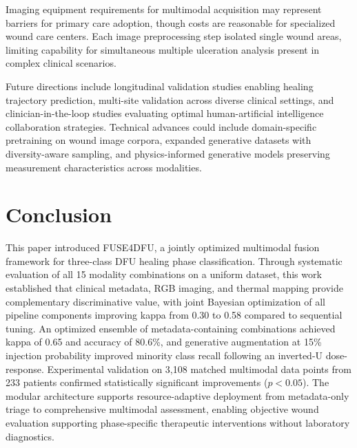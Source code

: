 \documentclass[journal,twoside,web]{ieeecolor}
\begin{document}
Imaging equipment requirements for multimodal acquisition may represent barriers for primary care adoption, though costs are reasonable for specialized wound care centers. Each image preprocessing step isolated single wound areas, limiting capability for simultaneous multiple ulceration analysis present in complex clinical scenarios.

Future directions include longitudinal validation studies enabling healing trajectory prediction, multi\nobreakdash-site validation across diverse clinical settings, and clinician\nobreakdash-in\nobreakdash-the\nobreakdash-loop studies evaluating optimal human\nobreakdash-artificial intelligence collaboration strategies. Technical advances could include domain\nobreakdash-specific pretraining on wound image corpora, expanded generative datasets with diversity\nobreakdash-aware sampling, and physics\nobreakdash-informed generative models preserving measurement characteristics across modalities.

\section{Conclusion}
This paper introduced FUSE4DFU, a jointly optimized multimodal fusion framework for three\nobreakdash-class DFU healing phase classification. Through systematic evaluation of all 15 modality combinations on a uniform dataset, this work established that clinical metadata, RGB imaging, and thermal mapping provide complementary discriminative value, with joint Bayesian optimization of all pipeline components improving kappa from 0.30 to 0.58 compared to sequential tuning. An optimized ensemble of metadata\nobreakdash-containing combinations achieved kappa of 0.65 and accuracy of 80.6\%, and generative augmentation at 15\% injection probability improved minority class recall following an inverted\nobreakdash-U dose\nobreakdash-response. Experimental validation on 3,108 matched multimodal data points from 233 patients confirmed statistically significant improvements ($p < 0.05$). The modular architecture supports resource\nobreakdash-adaptive deployment from metadata\nobreakdash-only triage to comprehensive multimodal assessment, enabling objective wound evaluation supporting phase\nobreakdash-specific therapeutic interventions without laboratory diagnostics.
\end{document}
